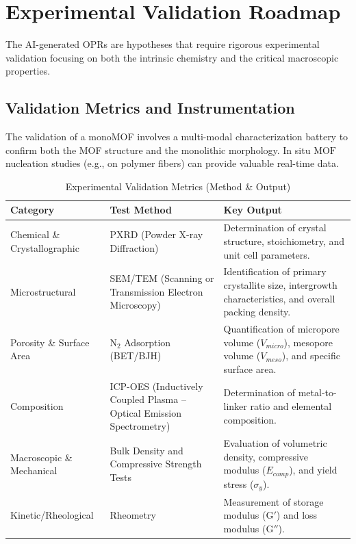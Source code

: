 \documentclass[12pt,a4paper]{article}
\begin{document}
\section{Experimental Validation Roadmap}

The AI-generated OPRs are hypotheses that require rigorous experimental validation focusing on both the intrinsic chemistry and the critical macroscopic properties.

\subsection{Validation Metrics and Instrumentation}

The validation of a monoMOF involves a multi-modal characterization battery 
to confirm both the MOF structure and the monolithic morphology. 
In situ $\text{MOF}$ nucleation studies (e.g., on polymer fibers) 
can provide valuable real-time data.\cite{ref35}

\begin{table}[htbp]
  \centering
  \caption{Experimental Validation Metrics (Method \& Output)}
  \label{tab:table2-1}
  \begin{tabular}{p{3cm} p{4.2cm} p{8cm}}
    \toprule
    \textbf{Category} & \textbf{Test Method} & \textbf{Key Output} \\
    \midrule
    Chemical \& Crystallographic & 
    PXRD (Powder X-ray Diffraction) & 
    Determination of crystal structure, stoichiometry, and unit cell parameters. \\

    Microstructural & 
    SEM/TEM (Scanning or Transmission Electron Microscopy) & 
    Identification of primary crystallite size, intergrowth characteristics, and overall packing density. \\

    Porosity \& Surface Area & 
    $\text{N}_2$ Adsorption (BET/BJH) & 
    Quantification of micropore volume ($V_{micro}$), mesopore volume ($V_{meso}$), and specific surface area. \\

    Composition & 
    ICP-OES (Inductively Coupled Plasma – Optical Emission Spectrometry) & 
    Determination of metal-to-linker ratio and elemental composition. \\

    Macroscopic \& Mechanical & 
    Bulk Density and Compressive Strength Tests & 
    Evaluation of volumetric density, compressive modulus ($E_{comp}$), and yield stress ($\sigma_y$). \\

    Kinetic/Rheological & 
    Rheometry & 
    Measurement of storage modulus ($\text{G}'$) and loss modulus ($\text{G}''$). \\
    \bottomrule
  \end{tabular}
\end{table}
\end{document}

